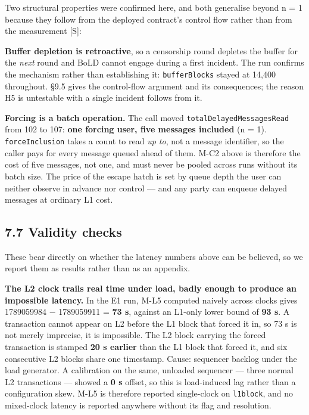 \documentclass[conference]{IEEEtran}
\renewcommand{\_}{\textunderscore\allowbreak}
\begin{document}
Two structural properties were confirmed here, and both generalise
beyond n = 1 because they follow from the deployed contract's control
flow rather than from the measurement {[}S{]}:

\textbf{Buffer depletion is retroactive}, so a censorship round depletes
the buffer for the \emph{next} round and BoLD cannot engage during a
first incident. The run confirms the mechanism rather than establishing
it: \texttt{bufferBlocks} stayed at 14,400 throughout. §9.5 gives the
control-flow argument and its consequences; the reason H5 is untestable
with a single incident follows from it.

\textbf{Forcing is a batch operation.} The call moved
\texttt{totalDelayedMessagesRead} from 102 to 107: \textbf{one forcing
user, five messages included} (n = 1). \texttt{forceInclusion} takes a
count to read \emph{up to}, not a message identifier, so the caller pays
for every message queued ahead of them. M-C2 above is therefore the cost
of five messages, not one, and must never be pooled across runs without
its batch size. The price of the escape hatch is set by queue depth the
user can neither observe in advance nor control --- and any party can
enqueue delayed messages at ordinary L1 cost.

\subsection{7.7 Validity checks}\label{validity-checks}

These bear directly on whether the latency numbers above can be
believed, so we report them as results rather than as an appendix.

\textbf{The L2 clock trails real time under load, badly enough to
produce an impossible latency.} In the E1 run, M-L5 computed naively
across clocks gives 1789059984 − 1789059911 = \textbf{73 s}, against an
L1-only lower bound of \textbf{93 s}. A transaction cannot appear on L2
before the L1 block that forced it in, so 73 s is not merely imprecise,
it is impossible. The L2 block carrying the forced transaction is
stamped \textbf{20 s earlier} than the L1 block that forced it, and six
consecutive L2 blocks share one timestamp. Cause: sequencer backlog
under the load generator. A calibration on the same, unloaded sequencer
--- three normal L2 transactions --- showed a \textbf{0 s} offset, so
this is load-induced lag rather than a configuration skew. M-L5 is
therefore reported single-clock on \texttt{l1\_block}, and no
mixed-clock latency is reported anywhere without its flag and
resolution.
\end{document}
